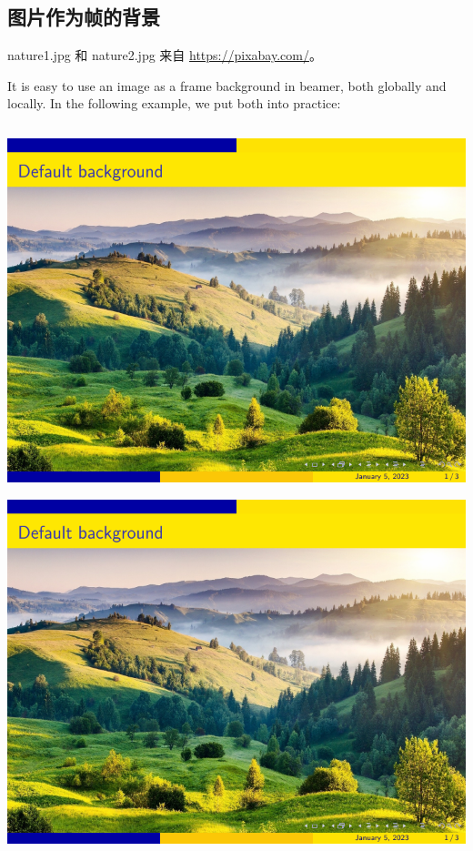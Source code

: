 \begin{column}{0.5\textwidth}
\subsection{图片作为帧的背景}

nature1.jpg 和 nature2.jpg 来自 \url{https://pixabay.com/}。

It is easy to use an image as a frame background in beamer, both globally and locally. In the following example, we put both into practice:

\inputminted[linenos=true]{latex}{examples/beamer/figure-background.tex}

\includegraphics[page=1]{examples/beamer/figure-background.pdf}

\includegraphics[page=2]{examples/beamer/figure-background.pdf}


\end{column}
